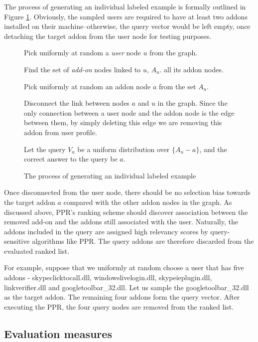 \documentclass[11pt,oneside]{book}
\let\Oldsubsection\subsection
\renewcommand{\subsection}{\FloatBarrier\Oldsubsection}
\begin{document}
The process of generating an individual labeled example is formally outlined in Figure \ref{fig:example-gen}. Obviously, the sampled users are required to have at least two addons installed on their machine--otherwise, the query vector would be left empty, once detaching the target addon from the user node for testing purposes. 

\begin{figure}
\begin{enumerate}[(a)]
\begin{small}
\item Pick uniformly at random a {\it user} node $u$ from the graph.
\item Find the set of {\it add-on} nodes linked to $u$, $A_u$.
  all its addon nodes.
\item Pick uniformly at random an addon node $a$ from the set $A_u$. 
\item Disconnect the link between nodes $a$ and $u$ in the
  graph. Since the only connection between a user node and the addon
  node is the edge between them, by simply deleting this edge we are
  removing this addon from user profile.
\item Let the query $V_u$ be a uniform distribution over $\{A_u-a\}$,
  and the correct answer to the query be $a$. 
\end{small}
\end{enumerate}
\caption{The process of generating an individual labeled example}
\label{fig:example-gen}
\end{figure}

Once disconnected from the user node, there should be no selection bias towards the target addon $a$ compared with the other addon nodes in the graph. As discussed above, PPR's ranking scheme should discover association between the removed add-on and the addons still associated with the user. Naturally, the addons included in the query are assigned high relevancy scores by query-sensitive algorithms like PPR. The query addons are therefore discarded from the evaluated ranked list. 

For example, suppose that we uniformly at random choose a user that has five addons - skypeclicktocall.dll, windowslivelogin.dll, skypeieplugin.dll, linkverifier.dll and googletoolbar\_32.dll. Let us sample the googletoolbar\_32.dll as the target addon. The remaining four addons form the query vector. After executing the PPR, the four query nodes are removed from the ranked list.

\subsection{Evaluation measures}
\end{document}
